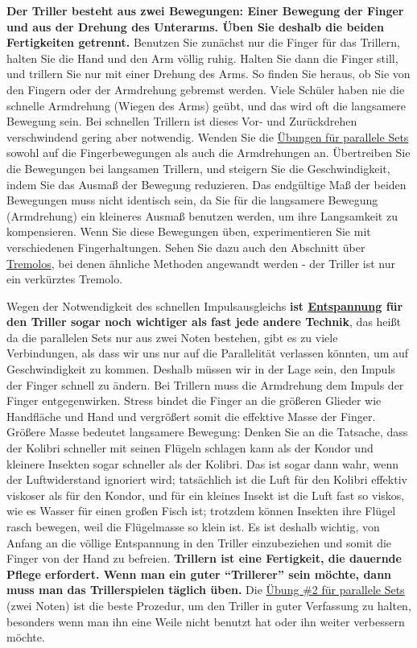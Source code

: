 \textbf{Der Triller besteht aus zwei Bewegungen: Einer Bewegung der Finger und aus der Drehung des Unterarms.
Üben Sie deshalb die beiden Fertigkeiten getrennt.}
Benutzen Sie zunächst nur die Finger für das Trillern, halten Sie die Hand und den Arm völlig ruhig.
Halten Sie dann die Finger still, und trillern Sie nur mit einer Drehung des Arms.
So finden Sie heraus, ob Sie von den Fingern oder der Armdrehung gebremst werden.
Viele Schüler haben nie die schnelle Armdrehung (Wiegen des Arms) geübt, und das wird oft die langsamere Bewegung sein.
Bei schnellen Trillern ist dieses Vor- und Zurückdrehen verschwindend gering aber notwendig.
Wenden Sie die \hyperlink{c1iii7b}{Übungen für parallele Sets} sowohl auf die Fingerbewegungen als auch die Armdrehungen an.
Übertreiben Sie die Bewegungen bei langsamen Trillern, und steigern Sie die Geschwindigkeit, indem Sie das Ausmaß der Bewegung reduzieren.
Das endgültige Maß der beiden Bewegungen muss nicht identisch sein, da Sie für die langsamere Bewegung (Armdrehung) ein kleineres Ausmaß benutzen werden, um ihre Langsamkeit zu kompensieren.
Wenn Sie diese Bewegungen üben, experimentieren Sie mit verschiedenen Fingerhaltungen.
Sehen Sie dazu auch den Abschnitt über \hyperlink{c1iii3b}{Tremolos}, bei denen ähnliche Methoden angewandt werden - der Triller ist nur ein verkürztes Tremolo.

Wegen der Notwendigkeit des schnellen Impulsausgleichs \textbf{ist \hyperlink{c1ii14}{Entspannung} für den Triller sogar noch wichtiger als fast jede andere Technik}, das heißt da die parallelen Sets nur aus zwei Noten bestehen, gibt es zu viele Verbindungen, als dass wir uns nur auf die Parallelität verlassen könnten, um auf Geschwindigkeit zu kommen.
Deshalb müssen wir in der Lage sein, den Impuls der Finger schnell zu ändern.
Bei Trillern muss die Armdrehung dem Impuls der Finger entgegenwirken.
Stress bindet die Finger an die größeren Glieder wie Handfläche und Hand und vergrößert somit die effektive Masse der Finger.
Größere Masse bedeutet langsamere Bewegung: Denken Sie an die Tatsache, dass der Kolibri schneller mit seinen Flügeln schlagen kann als der Kondor und kleinere Insekten sogar schneller als der Kolibri.
Das ist sogar dann wahr, wenn der Luftwiderstand ignoriert wird; tatsächlich ist die Luft für den Kolibri effektiv viskoser als für den Kondor, und für ein kleines Insekt ist die Luft fast so viskos, wie es Wasser für einen großen Fisch ist; trotzdem können Insekten ihre Flügel rasch bewegen, weil die Flügelmasse so klein ist.
Es ist deshalb wichtig, von Anfang an die völlige Entspannung in den Triller einzubeziehen und somit die Finger von der Hand zu befreien.
\textbf{Trillern ist eine Fertigkeit, die dauernde Pflege erfordert.
Wenn man ein guter \enquote{Trillerer} sein möchte, dann muss man das Trillerspielen täglich üben.}
Die \hyperlink{c1iii7b2}{Übung \#2 für parallele Sets} (zwei Noten) ist die beste Prozedur, um den Triller in guter Verfassung zu halten, besonders wenn man ihn eine Weile nicht benutzt hat oder ihn weiter verbessern möchte.

